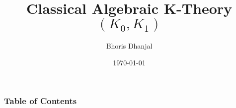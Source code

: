\documentclass{beamer}
\title{Classical Algebraic K-Theory $(K_0,K_1)$}
\subtitle{}
\author{Bhoris Dhanjal}
\institute{Department of Mathematics,\\ University of Mumbai}
\date{\today}
\begin{document}

\begin{frame}
	\maketitle %
\end{frame}




\begin{frame}
	\frametitle{Table of Contents}
	\tableofcontents
\end{frame}
\end{document}
